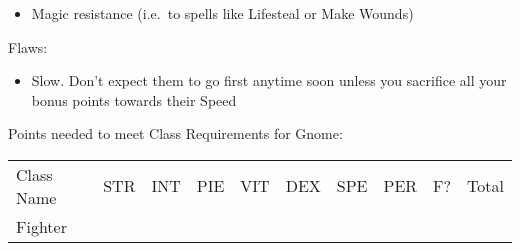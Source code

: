 \documentclass[12pt]{article}
\providecommand{\tightlist}{%
  \setlength{\itemsep}{0pt}\setlength{\parskip}{0pt}}
\begin{document}
\begin{itemize}
\tightlist
\item
  Magic resistance (i.e.~to spells like Lifesteal or Make Wounds)
\end{itemize}

Flaws:

\begin{itemize}
\tightlist
\item
  Slow. Don't expect them to go first anytime soon unless you sacrifice
  all your bonus points towards their Speed
\end{itemize}

Points needed to meet Class Requirements for Gnome:

\begin{longtable}[]{@{}llllllllll@{}}
\toprule
\begin{minipage}[t]{0.13\columnwidth}\raggedright\strut
Class Name
\strut\end{minipage} &
\begin{minipage}[t]{0.06\columnwidth}\raggedright\strut
STR
\strut\end{minipage} &
\begin{minipage}[t]{0.06\columnwidth}\raggedright\strut
INT
\strut\end{minipage} &
\begin{minipage}[t]{0.06\columnwidth}\raggedright\strut
PIE
\strut\end{minipage} &
\begin{minipage}[t]{0.06\columnwidth}\raggedright\strut
VIT
\strut\end{minipage} &
\begin{minipage}[t]{0.06\columnwidth}\raggedright\strut
DEX
\strut\end{minipage} &
\begin{minipage}[t]{0.06\columnwidth}\raggedright\strut
SPE
\strut\end{minipage} &
\begin{minipage}[t]{0.06\columnwidth}\raggedright\strut
PER
\strut\end{minipage} &
\begin{minipage}[t]{0.07\columnwidth}\raggedright\strut
F?
\strut\end{minipage} &
\begin{minipage}[t]{0.08\columnwidth}\raggedright\strut
Total
\strut\end{minipage}\tabularnewline
\begin{minipage}[t]{0.13\columnwidth}\raggedright\strut
Fighter
\strut\end{minipage} &

\end{longtable}
\end{document}
